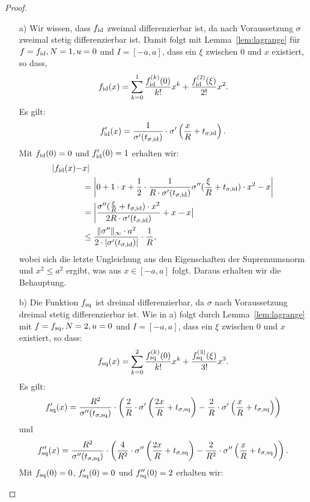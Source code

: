 \begin{proof}
	\begin{itemize}
  	\item[a)] Wir wissen, dass $f_{\mathrm{id}}$  zweimal differenzierbar ist, da nach Voraussetzung $\sigma$ zweimal stetig differenzierbar ist. Damit folgt mit Lemma~\ref{lem:lagrange} für $f = f_{\mathrm{id}}, N = 1, u = 0$ und $I = [-a, a]$, dass ein $\xi$ zwischen $0$ und $x$ existiert, so dass,
$$f_{\mathrm{id}}(x) = \sum_{k = 0}^1 \frac{f_{\mathrm{id}}^{(k)}(0)}{k!}x^k + \frac{f_{\mathrm{id}}^{(2)}(\xi)}{2!}x^{2}.$$
Es gilt:
$$
f_{\mathrm{id}}'(x) = \frac{1}{\sigma'(t_{\sigma,\mathrm{id}})} \cdot \sigma'\left(\frac{x}{R} + t_{\sigma,\mathrm{id}}\right).
$$
Mit $f_{\mathrm{id}}(0) = 0$ und $f_{\mathrm{id}}'(0) = 1$ erhalten wir:
  	\begin{equation*}
  	\begin{split}
  	 |f_{\mathrm{id}}(x) -  & x| \\
  	& = \bigg|0 + 1 \cdot x + \frac{1}{2} \cdot \frac{1}{R \cdot \sigma'(t_{\sigma,\mathrm{id}})} \sigma''(\frac{\xi}{R} + t_{\sigma,\mathrm{id}}) \cdot x^2 - x \bigg| \\
  	& = \bigg| \frac{\sigma''(\frac{\xi}{R} + t_{\sigma,\mathrm{id}})  \cdot x^2}{2R \cdot \sigma'(t_{\sigma, \mathrm{id}})} + x - x\big| \\
  	& \leq \frac{\| \sigma'' \|_{\infty} \cdot a^2}{2 \cdot |\sigma'(t_{\sigma, \mathrm{id}})|} \cdot \frac{1}{R},
  	\end{split}
  	\end{equation*}
  	wobei sich die letzte Ungleichung aus den Eigenschaften der Supremumsnorm und $x^2 \leq a^2$ ergibt, was aus $x \in [-a,a]$ folgt. Daraus erhalten wir die Behauptung.
  	\item[b)]  Die Funktion $f_{\mathrm{sq}}$ ist dreimal differenzierbar, da $\sigma$ nach Voraussetzung dreimal stetig differenzierbar ist. Wie in a) folgt durch Lemma~\ref{lem:lagrange} mit $f = f_{\mathrm{sq}}, N = 2, u = 0$ und $I = [-a, a]$, dass ein $\xi$ zwischen $0$ und $x$ existiert, so dass:
$$f_{\mathrm{sq}}(x) = \sum_{k = 0}^2 \frac{f_{\mathrm{sq}}^{(k)}(0)}{k!}x^k + \frac{f_{\mathrm{sq}}^{(3)}(\xi)}{3!}x^{3}.$$
Es gilt:
$$
f_{\mathrm{sq}}'(x) = \frac{R^2}{\sigma''(t_{\sigma, \mathrm{sq}})} \cdot \left(\frac{2}{R} \cdot\sigma'\left(\frac{2x}{R} + t_{\sigma, \mathrm{sq}}\right) - \frac{2}{R} \cdot \sigma'\left(\frac{x}{R} + t_{\sigma, \mathrm{sq}}\right)\right)
$$
und 
$$
f_{\mathrm{sq}}''(x) = \frac{R^2}{\sigma''(t_{\sigma, \mathrm{sq}})} \cdot \left(\frac{4}{R^2} \cdot\sigma''\left(\frac{2x}{R} + t_{\sigma, \mathrm{sq}}\right) - \frac{2}{R^2} \cdot \sigma''\left(\frac{x}{R} + t_{\sigma, \mathrm{sq}}\right)\right).
$$
Mit $f_{\mathrm{sq}}(0) = 0$, $f_{\mathrm{sq}}'(0) = 0$ und $f_{\mathrm{sq}}''(0) = 2$ erhalten wir:

\end{itemize}
\end{proof}
